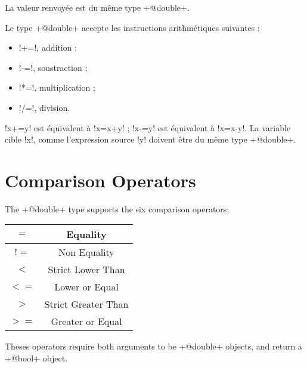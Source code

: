 La valeur renvoyée est du même type  \ggs+@double+.



Le type \ggs+@double+ accepte les instructions arithmétiques suivantes :
\begin{itemize}
  \item \ggs!+=!, addition ;
  \item \ggs!-=!, soustraction ;
  \item \ggs!*=!, multiplication ;
  \item \ggs!/=!, division.
\end{itemize}

\ggs!x+=y! est équivalent à \ggs!x=x+y! ; \ggs!x-=y! est équivalent à \ggs!x=x-y!.
La variable cible \ggs!x!, comme l'expression source \ggs!y! doivent être du même type \ggs+@double+. 







\section{Comparison Operators}

The \ggs+@double+ type supports the six comparison operators:\newline

\begin{tabular}{|c|c|}
\hline
$=$ & Equality \\
\hline
$!=$ & Non Equality \\
\hline
$<$  & Strict Lower Than \\
\hline
$<=$  & Lower or Equal \\
\hline
$>$  & Strict Greater Than \\
\hline
$>=$  & Greater or Equal \\
\hline
\end{tabular}

Theses operators require both arguments to be \ggs+@double+ objects, and return a \ggs+@bool+ object.


